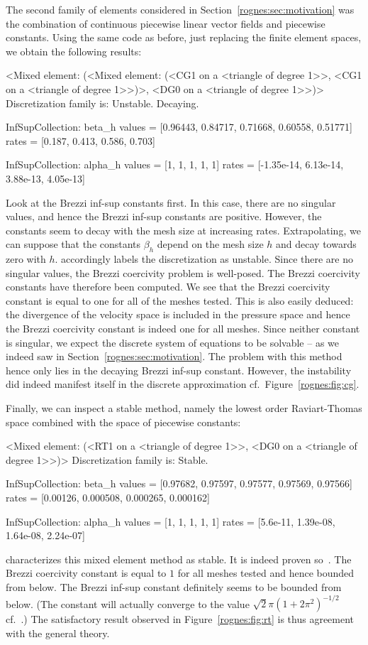 The second family of elements considered in
Section~\ref{rognes:sec:motivation} was the combination of continuous
piecewise linear vector fields and piecewise constants. Using the same
code as before, just replacing the finite element spaces, we obtain
the following results:
\begin{python}
<Mixed element: (<Mixed element: (<CG1 on a <triangle of degree 1>>,
<CG1 on a <triangle of degree 1>>)>, <DG0 on a <triangle of degree 1>>)>
Discretization family is: Unstable. Decaying.

InfSupCollection: beta_h
values =         [0.96443, 0.84717, 0.71668, 0.60558, 0.51771]
rates  =         [0.187, 0.413, 0.586, 0.703]

InfSupCollection: alpha_h
values =         [1, 1, 1, 1, 1]
rates  =         [-1.35e-14, 6.13e-14, 3.88e-13, 4.05e-13]
\end{python}
Look at the Brezzi inf-sup constants first. In this case, there are no
singular values, and hence the Brezzi inf-sup constants are
positive. However, the constants seem to decay with the mesh size at
increasing rates. Extrapolating, we can suppose that the constants
$\beta_h$ depend on the mesh size $h$ and decay towards zero with
$h$. \rognesascot{} accordingly labels the discretization as
unstable. Since there are no singular values, the Brezzi coercivity
problem is well-posed. The Brezzi coercivity constants have therefore
been computed. We see that the Brezzi coercivity constant is equal to
one for all of the meshes tested. This is also easily deduced: the
divergence of the velocity space is included in the pressure space and
hence the Brezzi coercivity constant is indeed one for all
meshes. Since neither constant is singular, we expect the discrete
system of equations to be solvable -- as we indeed saw in
Section~\ref{rognes:sec:motivation}. The problem with this method
hence only lies in the decaying Brezzi inf-sup constant. However, the
instability did indeed manifest itself in the discrete approximation
cf.~Figure~\ref{rognes:fig:cg}.

Finally, we can inspect a stable method, namely the lowest order
Raviart-Thomas space combined with the space of piecewise constants:
\begin{python}
<Mixed element: (<RT1 on a <triangle of degree 1>>,
<DG0 on a <triangle of degree 1>>)>
Discretization family is: Stable.

InfSupCollection: beta_h
values =         [0.97682, 0.97597, 0.97577, 0.97569, 0.97566]
rates  =         [0.00126, 0.000508, 0.000265, 0.000162]

InfSupCollection: alpha_h
values =         [1, 1, 1, 1, 1]
rates  =         [5.6e-11, 1.39e-08, 1.64e-08, 2.24e-07]
\end{python}
\rognesascot{} characterizes this mixed element method as stable. It is
indeed proven so~\cite{RaviartThomas1977}. The Brezzi coercivity
constant is equal to $1$ for all meshes tested and hence bounded from
below. The Brezzi inf-sup constant definitely seems to be bounded from
below. (The constant will actually converge to the value $\sqrt{2} \pi
(1 + 2 \pi^2)^{-1/2}$ cf.~\cite{ArnoldRognes2009}.)
The satisfactory result observed in Figure~\ref{rognes:fig:rt} is thus
agreement with the general theory.


